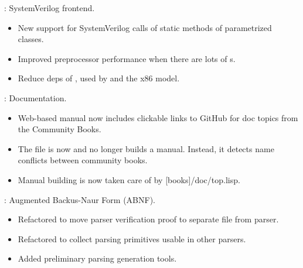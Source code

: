 
\begin{frame}

\implibtitle

:
SystemVerilog frontend.
\begin{itemize}
\item New support for SystemVerilog calls of
      static methods of parametrized classes.
\item Improved preprocessor performance when there are lots of s.
\item Reduce deps of , used by  and the x86
      model.
\end{itemize}

\end{frame}


\begin{frame}

\implibtitle

:
Documentation.
\begin{itemize}
\item Web-based manual now includes clickable links to GitHub for doc topics
      from the Community Books.
\item The file  is now 
      and no longer builds a manual.  Instead, it detects name conflicts between
      community books.
\item Manual building is now taken care of by [books]/doc/top.lisp.
\end{itemize}

\end{frame}


\begin{frame}

\implibtitle

:
Augmented Backus-Naur Form (ABNF).
\begin{itemize}
\item Refactored to move parser verification proof to separate file from parser.
\item Refactored to collect parsing primitives usable in other parsers.
\item Added preliminary parsing generation tools.
\end{itemize}

\end{frame}

